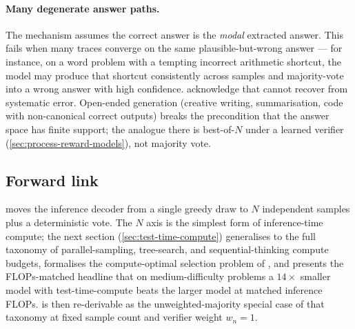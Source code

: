 \paragraph{Many degenerate answer paths.} The mechanism assumes the
correct answer is the \emph{modal} extracted answer. This fails when
many traces converge on the same plausible-but-wrong answer — for
instance, on a word problem with a tempting incorrect arithmetic
shortcut, the model may produce that shortcut consistently across
samples and majority-vote into a wrong answer with high confidence.
\citet[\S 5]{wang2022-self-consistency} acknowledge that
 cannot recover from systematic error. Open-ended
generation (creative writing, summarisation, code with non-canonical
correct outputs) breaks the precondition that the answer space has
finite support; the analogue there is best-of-$N$ under a learned
verifier (\cref{sec:process-reward-models}), not majority vote.

\subsection{Forward link}
\label{sec:sc-forward}

 moves the inference decoder from a single greedy draw
to $N$ independent samples plus a deterministic vote. The $N$ axis is
the simplest form of inference-time compute; the next section
(\cref{sec:test-time-compute}) generalises to the full taxonomy of
parallel-sampling, tree-search, and sequential-thinking compute
budgets, formalises the compute-optimal selection problem of
\citet{snell2024}, and presents the FLOPs-matched headline that on
medium-difficulty problems a $14\times$ smaller model with
test-time-compute beats the larger model at matched inference FLOPs.
 is then re-derivable as the unweighted-majority
special case of that taxonomy at fixed sample count and verifier
weight $w_n = 1$.
